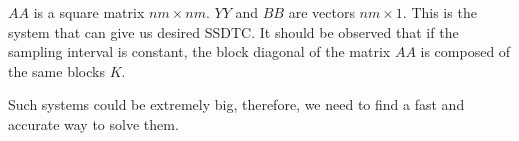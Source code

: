 
$AA$ is a square matrix $nm \times nm$. $YY$ and $BB$ are vectors $nm \times 1$. This is the system that can give us desired SSDTC. It should be observed that if the sampling interval is constant, the block diagonal of the matrix $AA$ is composed of the same blocks $K$.

Such systems could be extremely big, therefore, we need to find a fast and accurate way to solve them.
